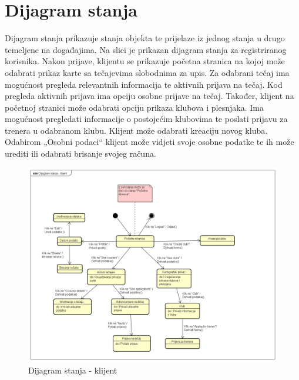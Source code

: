 			
			
			
		\eject
		
		\section{Dijagram stanja}
			
		\noindent Dijagram stanja prikazuje stanja objekta te prijelaze iz jednog stanja u drugo temeljene na događajima. Na slici je prikazan dijagram stanja za registriranog korisnika. Nakon prijave, klijentu se prikazuje početna stranica na kojoj može odabrati prikaz karte sa tečajevima slobodnima za upis. Za odabrani tečaj ima mogućnost pregleda relevantnih informacija te aktivnih prijava na tečaj. Kod pregleda aktivnih prijava ima opciju osobne prijave na tečaj. Također, klijent na početnoj stranici može odabrati opciju prikaza klubova i plesnjaka. Ima mogućnost pregledati informacije o postojećim klubovima te poslati prijavu za trenera u odabranom klubu. Klijent može odabrati kreaciju novog kluba. Odabirom „Osobni podaci“ klijent može vidjeti svoje osobne podatke te ih može urediti ili odabrati brisanje svojeg računa.

		\begin{figure}[H]
			\includegraphics[scale=0.4]{slike/DijagramStanja.PNG} %
			\centering
			\caption{Dijagram stanja - klijent}
			\label{fig:stanje}
		\end{figure}
			
